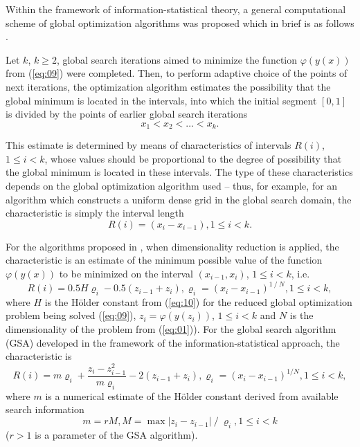 \documentclass[runningheads]{llncs}
\begin{document}
Within the framework of information-statistical theory, a general computational scheme of global optimization algorithms was proposed which in brief is as follows \cite{c15,c30,c35}.

Let $k$, $k \geq 2$, global search iterations aimed to minimize the function $\varphi(y(x))$ from (\ref{eq:09}) were completed. Then, to perform adaptive choice of the points of next iterations, the optimization algorithm estimates the possibility that the global minimum is located  in the intervals, into which the initial segment $[0,1]$ is divided by the points of earlier global search  iterations
\begin{equation}
\label{eq:11}
x_1<x_2< \dots <x_k.
\end{equation}

This estimate is determined by means of characteristics of intervals $R(i)$, $1 \leq i<k$, whose values should be proportional to the degree of possibility that the global minimum is located  in these intervals. The type of these characteristics depends on the global optimization algorithm used -- thus, for example, for an algorithm which constructs a uniform dense grid in the global search domain, the characteristic is simply the interval length 
\begin{equation}
\label{eq:12}
R(i)=(x_i-x_{i-1}), 1 \leq i<k.
\end{equation}


For the algorithms proposed in \cite{c22,c23}, when dimensionality reduction is applied, the characteristic is an estimate of the minimum possible value of the function $\varphi(y(x))$ to be minimized on the interval $(x_{i-1},x_i )$, $1 \leq i < k$, i.e.
\begin{equation}
\label{eq:13}
R(i) = 0.5 H \varrho_i - 0.5 (z_{i-1} + z_i ), \varrho_i = (x_i-x_{i-1} ) ^ {1⁄N}, 1 \leq i < k,
\end{equation}
where $H$ is the H{\" o}lder constant from (\ref{eq:10}) for the reduced global optimization problem being solved (\ref{eq:09}), $z_i = \varphi(y(z_i))$, $1 \leq i < k$ and $N$ is the dimensionality of the problem from (\ref{eq:01})).  For the global search algorithm (GSA) \cite{c15,c24} developed in the framework of the information-statistical approach, the characteristic is
\begin{equation}
\label{eq:14}
R(i)=m\varrho_i+\frac{z_i-z_{i-1}^2}{m\varrho_i}-2(z_{i-1}+z_i ),\varrho_i=(x_i-x_{i-1})^{1/N}, 1 \leq i < k,
\end{equation}
where $m$ is a numerical estimate of the H{\" o}lder constant derived from available search information
\begin{equation}
\label{eq:15}
m= r M, M = \max |z_i-z_{i-1} | ⁄ \varrho_i, 1 \leq i<k
\end{equation}
 ($r>1$ is a parameter of the GSA algorithm).
\end{document}
